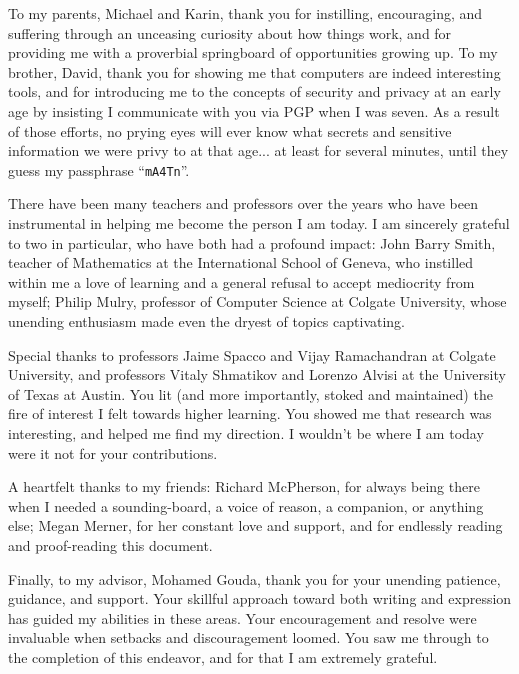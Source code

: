 To my parents, Michael and Karin, thank you for instilling, encouraging, and suffering through an unceasing curiosity about how things work,
    and for providing me with a proverbial springboard of opportunities growing up.
To my brother, David, thank you for showing me that computers are indeed interesting tools,
    and for introducing me to the concepts of security and privacy at an early age
    by insisting I communicate with you via PGP when I was seven.
As a result of those efforts, no prying eyes will ever know what secrets and sensitive information we were privy to at that age...
    at least for several minutes, until they guess my passphrase ``\texttt{mA4Tn}''.

There have been many teachers and professors over the years who have been instrumental in helping me become the person I am today.
I am sincerely grateful to two in particular, who have both had a profound impact:
    John Barry Smith, teacher of Mathematics at the International School of Geneva,
        who instilled within me a love of learning and a general refusal to accept mediocrity from myself;
    Philip Mulry, professor of Computer Science at Colgate University,
        whose unending enthusiasm made even the dryest of topics captivating.

Special thanks to professors Jaime Spacco and Vijay Ramachandran at Colgate University,
    and professors Vitaly Shmatikov and Lorenzo Alvisi at the University of Texas at Austin.
You lit (and more importantly, stoked and maintained) the fire of interest I felt towards higher learning.
You showed me that research was interesting, and helped me find my direction.
I wouldn't be where I am today were it not for your contributions.

A heartfelt thanks to my friends:
    Richard McPherson, for always being there when I needed a sounding-board, a voice of reason, a companion, or anything else;
    Megan Merner, for her constant love and support, and for endlessly reading and proof-reading this document.

Finally, to my advisor, Mohamed Gouda, thank you for your unending patience, guidance, and support.
Your skillful approach toward both writing and expression has guided my abilities in these areas.
Your encouragement and resolve were invaluable when setbacks and discouragement loomed.
You saw me through to the completion of this endeavor, and for that I am extremely grateful.
